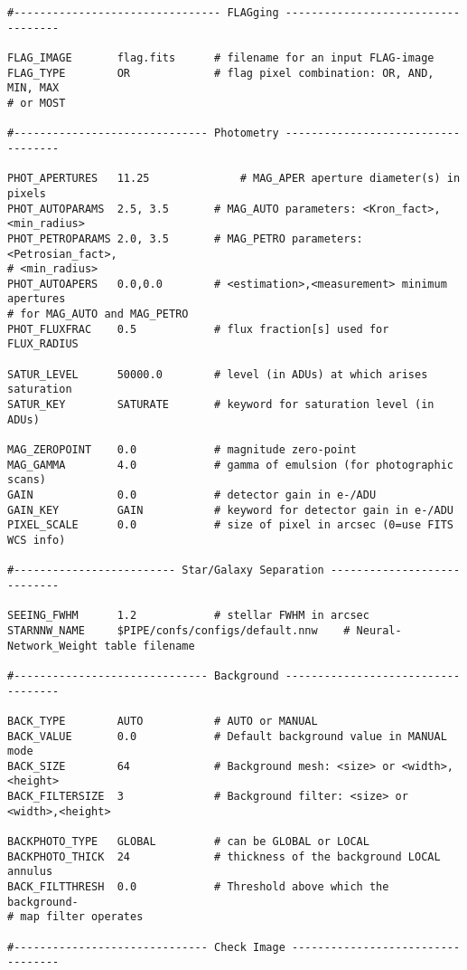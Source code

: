 \documentclass[apj, revtex4]{emulateapj}
\begin{document}
\begin{verbatim}
#-------------------------------- FLAGging -----------------------------------

FLAG_IMAGE       flag.fits      # filename for an input FLAG-image
FLAG_TYPE        OR             # flag pixel combination: OR, AND, MIN, MAX
# or MOST

#------------------------------ Photometry -----------------------------------

PHOT_APERTURES   11.25              # MAG_APER aperture diameter(s) in pixels
PHOT_AUTOPARAMS  2.5, 3.5       # MAG_AUTO parameters: <Kron_fact>,<min_radius>
PHOT_PETROPARAMS 2.0, 3.5       # MAG_PETRO parameters: <Petrosian_fact>,
# <min_radius>
PHOT_AUTOAPERS   0.0,0.0        # <estimation>,<measurement> minimum apertures
# for MAG_AUTO and MAG_PETRO
PHOT_FLUXFRAC    0.5            # flux fraction[s] used for FLUX_RADIUS

SATUR_LEVEL      50000.0        # level (in ADUs) at which arises saturation
SATUR_KEY        SATURATE       # keyword for saturation level (in ADUs)

MAG_ZEROPOINT    0.0            # magnitude zero-point
MAG_GAMMA        4.0            # gamma of emulsion (for photographic scans)
GAIN             0.0            # detector gain in e-/ADU
GAIN_KEY         GAIN           # keyword for detector gain in e-/ADU
PIXEL_SCALE      0.0            # size of pixel in arcsec (0=use FITS WCS info)

#------------------------- Star/Galaxy Separation ----------------------------

SEEING_FWHM      1.2            # stellar FWHM in arcsec
STARNNW_NAME     $PIPE/confs/configs/default.nnw    # Neural-Network_Weight table filename

#------------------------------ Background -----------------------------------

BACK_TYPE        AUTO           # AUTO or MANUAL
BACK_VALUE       0.0            # Default background value in MANUAL mode
BACK_SIZE        64             # Background mesh: <size> or <width>,<height>
BACK_FILTERSIZE  3              # Background filter: <size> or <width>,<height>

BACKPHOTO_TYPE   GLOBAL         # can be GLOBAL or LOCAL
BACKPHOTO_THICK  24             # thickness of the background LOCAL annulus
BACK_FILTTHRESH  0.0            # Threshold above which the background-
# map filter operates

#------------------------------ Check Image ----------------------------------


\end{verbatim}
\end{document}
